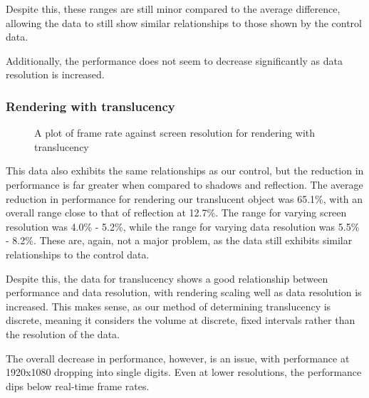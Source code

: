 Despite this, these ranges are still minor compared to the average difference, allowing the data to still show similar relationships to those shown by the control data.

Additionally, the performance does not seem to decrease significantly as data resolution is increased.

\subsubsection{Rendering with translucency}
\begin{figure}[H]
\centering
{}

\caption{A plot of frame rate against screen resolution for rendering with translucency}
\end{figure}

This data also exhibits the same relationships as our control, but the reduction in performance is far greater when compared to shadows and reflection. The average reduction in performance for rendering our translucent object was 65.1\%, with an overall range close to that of reflection at 12.7\%. The range for varying screen resolution was 4.0\% - 5.2\%, while the range for varying data resolution was 5.5\% - 8.2\%. These are, again, not a major problem, as the data still exhibits similar relationships to the control data.

Despite this, the data for translucency shows a good relationship between performance and data resolution, with rendering scaling well as data resolution is increased. This makes sense, as our method of determining translucency is discrete, meaning it considers the volume at discrete, fixed intervals rather than the resolution of the data.

The overall decrease in performance, however, is an issue, with performance at 1920x1080 dropping into single digits. Even at lower resolutions, the performance dips below real-time frame rates.

